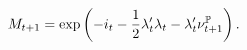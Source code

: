 \begin{equation} \label{eq:nSDF}
	M_{t+1} = \exp\left( -i_{t} -\frac{1}{2} \lambda_{t}' \lambda_{t} - \lambda_{t}' \nu_{t+1}^{\mathbb{P}} \right).
\end{equation}